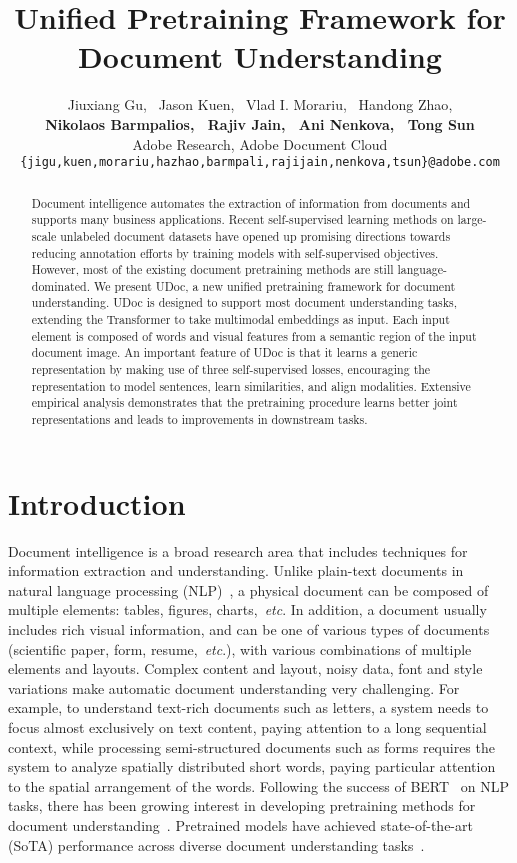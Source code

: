 \documentclass{article}
\title{Unified Pretraining Framework for Document Understanding}
\author{{Jiuxiang Gu, \ Jason Kuen, \ Vlad I. Morariu, \ Handong Zhao},\\
	{\textbf{Nikolaos Barmpalios, \ Rajiv Jain, \ Ani Nenkova, \ Tong Sun}}\\
	Adobe Research, Adobe Document Cloud\\
	\texttt{\{jigu,kuen,morariu,hazhao,barmpali,rajijain,nenkova,tsun\}@adobe.com}
}
\def\etc{\emph{etc}}
\begin{document}
\maketitle
\begin{abstract}
	Document intelligence automates the extraction of information from documents and supports many business applications. Recent self-supervised learning methods on large-scale unlabeled document datasets have opened up promising directions towards reducing annotation efforts by training models with self-supervised objectives. However, most of the existing document pretraining methods are still language-dominated. We present UDoc, a new unified pretraining framework for document understanding. UDoc is designed to support most document understanding tasks, extending the Transformer to take multimodal embeddings as input. Each input element is composed of words and visual features from a semantic region of the input document image. An important feature of UDoc is that it learns a generic representation by making use of three self-supervised losses, encouraging the representation to model sentences, learn similarities, and align modalities. Extensive empirical analysis demonstrates that the pretraining procedure learns better joint representations and leads to improvements in downstream tasks.
\end{abstract}
	
	\section{Introduction}
	Document intelligence is a broad research area that includes techniques for information extraction and understanding. Unlike plain-text documents in natural language processing (NLP)~\cite{yang2016hierarchical,goldstein2000multi}, a physical document can be composed of multiple elements: {tables, figures, charts},~\etc. In addition, a document usually includes rich visual information, and can be one of various types of documents (scientific paper, form, resume,~\etc.), with various combinations of multiple elements and layouts.
	Complex content and layout, noisy data, font and style variations make automatic document understanding very challenging. For example, {to understand text-rich} documents such as letters, a system needs to focus almost exclusively on text content, paying attention to a long sequential context, while processing semi-structured documents such as forms requires the system to analyze spatially distributed short words, paying particular attention to the spatial arrangement of the words. Following the success of BERT~\cite{dai2019transformer} on NLP tasks, there has been growing interest in developing {pretraining} methods for document understanding~\cite{xu2020layoutlm,xu2020layoutlmv2,selfdoc2021}. {Pretrained} models have achieved state-of-the-art (SoTA) performance across diverse document understanding tasks~\cite{park2019cord,harley2015icdar}.
	
\end{document}
